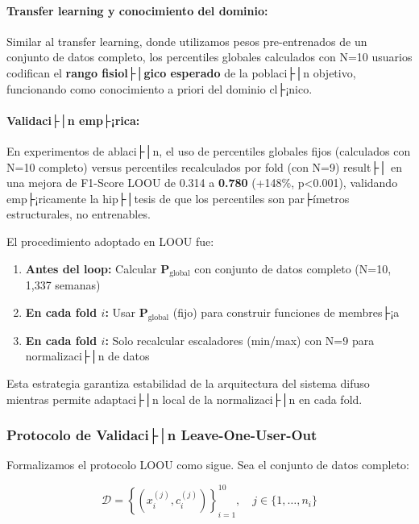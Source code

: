 \paragraph{Transfer learning y conocimiento del dominio:}
Similar al transfer learning, donde utilizamos pesos pre-entrenados de un conjunto de datos completo, los percentiles globales calculados con N=10 usuarios codifican el \textbf{rango fisiol├│gico esperado} de la poblaci├│n objetivo, funcionando como conocimiento a priori del dominio cl├¡nico.

\paragraph{Validaci├│n emp├¡rica:}
En experimentos de ablaci├│n, el uso de percentiles globales fijos (calculados con N=10 completo) versus percentiles recalculados por fold (con N=9) result├│ en una mejora de F1-Score LOOU de 0.314 a \textbf{0.780} (+148\%, p<0.001), validando emp├¡ricamente la hip├│tesis de que los percentiles son par├ímetros estructurales, no entrenables.

El procedimiento adoptado en LOOU fue:

\begin{enumerate}
    \item \textbf{Antes del loop:} Calcular \(\mathbf{P}_{\text{global}}\) con conjunto de datos completo (N=10, 1,337 semanas)
    \item \textbf{En cada fold \(i\):} Usar \(\mathbf{P}_{\text{global}}\) (fijo) para construir funciones de membres├¡a
    \item \textbf{En cada fold \(i\):} Solo recalcular escaladores (min/max) con N=9 para normalizaci├│n de datos
\end{enumerate}

Esta estrategia garantiza estabilidad de la arquitectura del sistema difuso mientras permite adaptaci├│n local de la normalizaci├│n en cada fold.

\subsubsection{Protocolo de Validaci├│n Leave-One-User-Out}
\label{subsubsec:protocolo_loou}

Formalizamos el protocolo LOOU como sigue. Sea el conjunto de datos completo:

\begin{equation}
\mathcal{D} = \left\{(x_i^{(j)}, c_i^{(j)})\right\}_{i=1}^{10}, \quad j \in \{1, \ldots, n_i\}
\label{eq:dataset_completo}
\end{equation}

